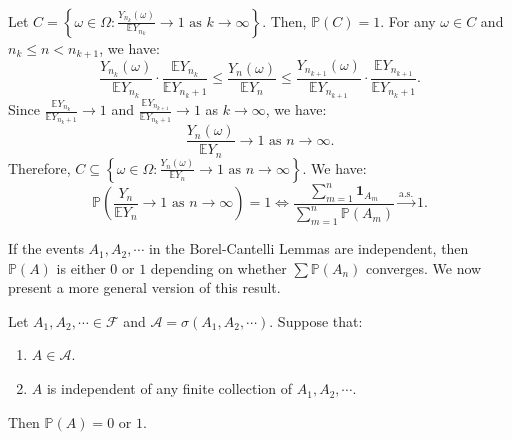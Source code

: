 \documentclass{huhtakm-template-book-v2}
\newcommand{\prob}{\mathbb{P}}
\newcommand{\expect}{\mathbb{E}}
\begin{document}
\begin{proofing}
\begin{align*}
        \end{align*}
        Let $C = \left\{\omega \in \Omega:\frac{Y_{n_{k}}(\omega)}{\expect{Y_{n_{k}}}} \to 1\text{ as }k \to \infty\right\}$. Then, $\prob(C) = 1$. For any $\omega \in C$ and $n_{k} \leq n < n_{k+1}$, we have:
        \begin{equation*}
            \frac{Y_{n_{k}}(\omega)}{\expect{Y_{n_{k}}}}\cdot\frac{\expect{Y_{n_{k}}}}{\expect{Y_{n_{k}+1}}} \leq \frac{Y_{n}(\omega)}{\expect{Y_{n}}} \leq \frac{Y_{n_{k+1}}(\omega)}{\expect{Y_{n_{k+1}}}}\cdot\frac{\expect{Y_{n_{k+1}}}}{\expect{Y_{n_{k}+1}}}.
        \end{equation*}
        Since $\frac{\expect{Y_{n_{k}}}}{\expect{Y_{n_{k}+1}}} \to 1$ and $\frac{\expect{Y_{n_{k+1}}}}{\expect{Y_{n_{k}+1}}} \to 1$ as $k \to \infty$, we have:
        \begin{equation*}
            \frac{Y_{n}(\omega)}{\expect{Y_{n}}} \to 1\text{ as }n \to \infty.
        \end{equation*}
        Therefore, $C\subseteq\left\{\omega \in \Omega:\frac{Y_{n}(\omega)}{\expect{Y_{n}}} \to 1\text{ as }n \to \infty\right\}$. We have:
        \begin{equation*}
            \prob\left(\frac{Y_{n}}{\expect{Y_{n}}} \to 1\text{ as }n \to \infty\right) = 1 \Longleftrightarrow \frac{\sum_{m = 1}^{n}\mathbf{1}_{A_{m}}}{\sum_{m = 1}^{n}\prob(A_{m})} \xrightarrow{\text{a.s.}} 1.
        \end{equation*}
    \end{proofing}
    If the events $A_{1}, A_{2},\cdots$ in the Borel-Cantelli Lemmas are independent, then $\prob(A)$ is either $0$ or $1$ depending on whether $\sum\prob(A_{n})$ converges. We now present a more general version of this result.
    \begin{thm}
        Let $A_{1},A_{2},\cdots \in \mathcal{F}$ and $\mathcal{A} = \sigma(A_{1},A_{2},\cdots)$. Suppose that:
        \begin{enumerate}
            \item $A \in \mathcal{A}$.
            \item $A$ is independent of any finite collection of $A_{1},A_{2},\cdots$.
        \end{enumerate}
        Then $\prob(A) = 0$ or $1$.
    \end{thm}
\end{document}
